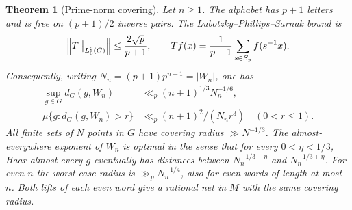 \documentclass[11pt,reqno]{amsart}
\newtheorem{theorem}{Theorem}[section]
\theoremstyle{definition}
\theoremstyle{remark}
\numberwithin{equation}{section}
\begin{document}
\begin{theorem}[Prime-norm covering]\label{m6:cover}
Let \(n\ge1\). The alphabet has \(p+1\) letters and is free on
\((p+1)/2\) inverse pairs. The Lubotzky--Phillips--Sarnak bound is
\[
 \left\|T\bigm|_{L^2_0(G)}\right\|\le \frac{2\sqrt p}{p+1},
 \qquad T f(x)=\frac{1}{p+1}\sum_{s\in S_p}f(s^{-1}x).
\]
Consequently, writing \(N_n=(p+1)p^{n-1}=|W_n|\), one has
\[
 \begin{aligned}
 \sup_{g\in G}d_G(g,W_n)&\ll_p(n+1)^{1/3}N_n^{-1/6},\\
 \mu\{g:d_G(g,W_n)>r\}&\ll_p (n+1)^2/(N_n r^3)
 \quad (0<r\le1).
 \end{aligned}
\]
All finite sets of \(N\) points in \(G\) have covering radius
\(\gg N^{-1/3}\). The almost-everywhere exponent of \(W_n\) is
optimal in the sense that for every \(0<\eta<1/3\), Haar-almost every
\(g\) eventually has distances between \(N_n^{-1/3-\eta}\) and
\(N_n^{-1/3+\eta}\). For even \(n\) the worst-case radius is
\(\gg_p N_n^{-1/4}\), also for even words of length at most \(n\).
Both lifts of each even word give a rational net in \(M\) with the
same covering radius.
\end{theorem}
\end{document}
